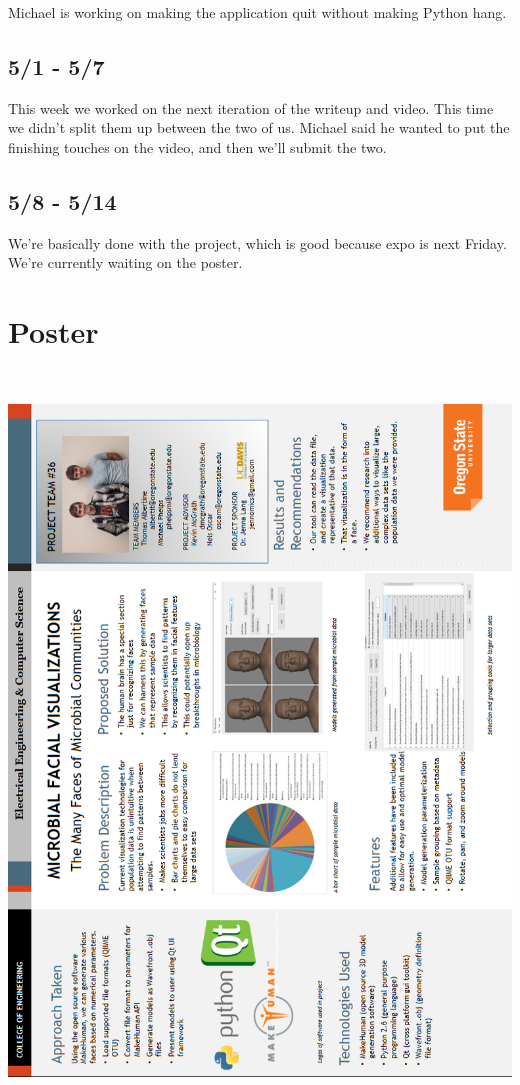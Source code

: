 \documentclass[letterpaper,10pt, onecolumn, draftclsnofoot]{IEEEtran}
\begin{document}
Michael is working on making the application quit without making Python hang.

\subsection{5/1 - 5/7}
This week we worked on the next iteration of the writeup and video. This time we didn't split them up between the two of us. Michael said he wanted to put the finishing touches on the video, and then we'll submit the two.

\subsection{5/8 - 5/14}
We're basically done with the project, which is good because expo is next Friday. We're currently waiting on the poster.

\section{Poster}
\
\begin{center}
	\includegraphics[height=\textheight]{Poster.png}
\end{center}
\restoregeometry
\end{document}

